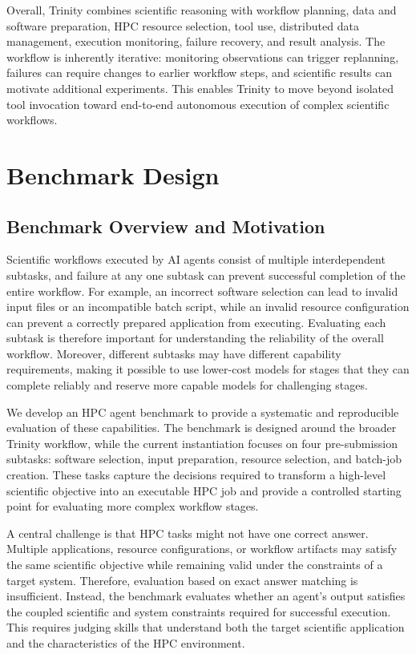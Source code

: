 \documentclass[conference]{IEEEtran}
\begin{document}
Overall, Trinity combines scientific reasoning with workflow
planning, data and software preparation, HPC resource selection,
tool use, distributed data management, execution monitoring,
failure recovery, and result analysis. The workflow is inherently
iterative: monitoring observations can trigger replanning,
failures can require changes to earlier workflow steps, and
scientific results can motivate additional experiments. This
enables Trinity to move beyond isolated tool invocation toward
end-to-end autonomous execution of complex scientific workflows.



\section{Benchmark Design}\label{sec}

\subsection{Benchmark Overview and Motivation}

Scientific workflows executed by AI agents consist of multiple interdependent subtasks, and failure at any one subtask can prevent successful completion of the entire workflow. For example, an incorrect software selection can lead to invalid input files or an incompatible batch script, while an invalid resource configuration can prevent a correctly prepared application from executing. Evaluating each subtask is therefore important for understanding the reliability of the overall workflow. Moreover, different subtasks may have different capability requirements, making it possible to use lower-cost models for stages that they can complete reliably and reserve more capable models for challenging stages.

We develop an HPC agent benchmark to provide a systematic and reproducible evaluation of these capabilities. The benchmark is designed around the broader Trinity workflow, while the current instantiation focuses on four pre-submission subtasks: software selection, input preparation, resource selection, and batch-job creation. These tasks capture the decisions required to transform a high-level scientific objective into an executable HPC job and provide a controlled starting point for evaluating more complex workflow stages.

A central challenge is that HPC tasks might not have one correct answer. Multiple applications, resource configurations, or workflow artifacts may satisfy the same scientific objective while remaining valid under the constraints of a target system. Therefore, evaluation based on exact answer matching is insufficient. Instead, the benchmark evaluates whether an agent's output satisfies the coupled scientific and system constraints required for successful execution. This requires judging skills that understand both the target scientific application and the characteristics of the HPC environment.
\end{document}
